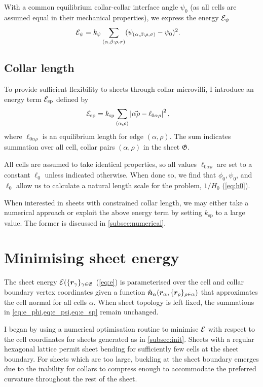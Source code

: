With a common equilibrium collar-collar interface angle $\psi_0$ (as all cells are assumed equal in their mechanical properties), we express the energy $\mathcal{E}_\psi$ 
\begin{align}
	\mathcal{E}_\psi &= k_\psi \sum_{(\alpha, \beta: \rho, \sigma)} (\psi_{(\alpha, \beta: \rho, \sigma)} - \psi_0)^2. \label{eq:e_psi}
\end{align}

\subsection{Collar length}

To provide sufficient flexibility to sheets through collar microvilli, I introduce an energy term $\mathcal{E}_{\text{sp}}$ defined by 
\begin{align}
	\mathcal{E}_{\text{sp}} &= k_{\text{sp}} \sum_{(\alpha, \rho)} \left| \vec{\alpha\rho} - \ell_{0\alpha\rho} \right|^2, \label{eq:e_sp}
\end{align}
\noindent where $\ell_{0\alpha\rho}$ is an equilibrium length for edge $(\alpha, \rho)$. The sum indicates summation over all cell, collar pairs $(\alpha, \rho)$ in the sheet $\mathfrak{G}$.

All cells are assumed to take identical properties, so all values $\ell_{0\alpha\rho}$ are set to a constant $\ell_0$ unless indicated otherwise. 
When done so, we find that $\phi_0, \psi_0$, and $\ell_0$ allow us to calculate a natural length scale for the problem, $1/H_0$ (\cref{eq:h0}).

When interested in sheets with constrained collar length, we may either take a numerical approach or exploit the above energy term by setting $k_{\text{sp}}$ to a large value. 
The former is discussed in \cref{subsec:numerical}.

\section{Minimising sheet energy}

The sheet energy $\mathcal{E}(\{\bm{r}_\gamma \}_{\gamma \in \mathfrak{G}}$ (\cref{eq:e}) is parameterised over the cell and collar boundary vertex coordinates given a function $\hat{\bm{n}}_\alpha(\bm{r}_\alpha, \{\bm{r}_\rho \}_{\rho\in\alpha})$ that approximates the cell normal for all cells $\alpha$.
When sheet topology is left fixed, the summations in \cref{eq:e_phi,eq:e_psi,eq:e_sp} remain unchanged.

I began by using a numerical optimisation routine to minimise $\mathcal{E}$ with respect to the cell coordinates for sheets generated as in \cref{subsec:init}. 
Sheets with a regular hexagonal lattice permit sheet bending for sufficiently few cells at the sheet boundary.
For sheets which are too large, buckling at the sheet boundary emerges due to the inability for collars to compress enough to accommodate the preferred curvature throughout the rest of the sheet.

